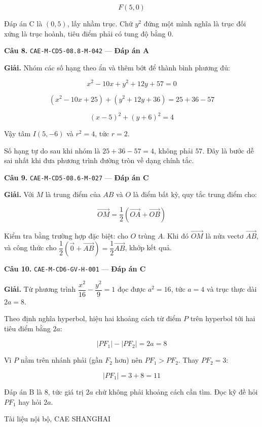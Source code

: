 \documentclass[11pt, a4paper]{article}
\begin{document}
$$F(5, 0)$$

 Đáp án C là $(0, 5)$, lấy nhầm trục. Chữ $y^2$ đứng một mình nghĩa là trục đối xứng là trục hoành, tiêu điểm phải có tung độ bằng $0$.

\textbf{Câu 8.} \texttt{CAE-M-CD5-08.8-M-042} — \textbf{Đáp án A}

\textbf{Giải.} Nhóm các số hạng theo ẩn và thêm bớt để thành bình phương đủ:

$$x^2 - 10x + y^2 + 12y + 57 = 0$$

$$(x^2 - 10x + 25) + (y^2 + 12y + 36) = 25 + 36 - 57$$

$$(x - 5)^2 + (y + 6)^2 = 4$$

Vậy tâm $I(5, -6)$ và $r^2 = 4$, tức $r = 2$.

 Số hạng tự do sau khi nhóm là $25 + 36 - 57 = 4$, không phải $57$. Đây là bước dễ sai nhất khi đưa phương trình đường tròn về dạng chính tắc.

\textbf{Câu 9.} \texttt{CAE-M-CD5-08.6-M-027} — \textbf{Đáp án C}

\textbf{Giải.} Với $M$ là trung điểm của $AB$ và $O$ là điểm bất kỳ, quy tắc trung điểm cho:

$$\vec{OM} = \frac{1}{2}\left(\vec{OA} + \vec{OB}\right)$$

 Kiểm tra bằng trường hợp đặc biệt: cho $O$ trùng $A$. Khi đó $\vec{OM}$ là nửa vectơ $\vec{AB}$, và công thức cho $\dfrac{1}{2}\left(\vec{0} + \vec{AB}\right) = \dfrac{1}{2}\vec{AB}$, khớp kết quả.

\textbf{Câu 10.} \texttt{CAE-M-CD6-GV-H-001} — \textbf{Đáp án C}

\textbf{Giải.} Từ phương trình $\dfrac{x^2}{16} - \dfrac{y^2}{9} = 1$ đọc được $a^2 = 16$, tức $a = 4$ và trục thực dài $2a = 8$.

Theo định nghĩa hyperbol, hiệu hai khoảng cách từ điểm $P$ trên hyperbol tới hai tiêu điểm bằng $2a$:

$$|PF_1| - |PF_2| = 2a = 8$$

Vì $P$ nằm trên nhánh phải (gần $F_2$ hơn) nên $PF_1 > PF_2$. Thay $PF_2 = 3$:

$$|PF_1| = 3 + 8 = 11$$

 Đáp án B là $8$, tức giá trị $2a$ chứ không phải khoảng cách cần tìm. Đọc kỹ đề hỏi $PF_1$ hay hỏi $2a$.
\vspace{0.8cm}
\begin{center}
{\footnotesize\color{cae_blue} Tài liệu nội bộ, CAE SHANGHAI}
\end{center}
\end{document}
